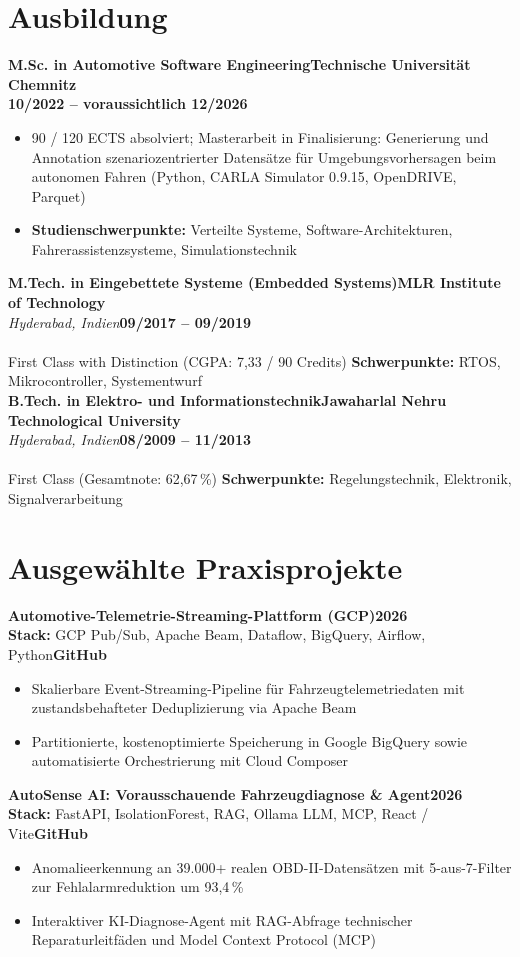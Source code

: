 \documentclass[10pt,a4paper]{article}
\newcommand{\educationitem}[4]{%
  \noindent\textbf{#1}\hfill\textbf{#2}\\[0.02em]
  {\footnotesize\textit{\color{accent} #3}}\hfill{\footnotesize\textbf{#4}}\\[0.04em]
}
\newcommand{\projectitem}[4]{%
  \noindent\textbf{#1}\hfill{\footnotesize\textbf{#2}}\\[0.02em]
  {\scriptsize\color{subtext}\textbf{Stack:} #3}\hfill{\scriptsize\textbf{#4}}\\[0.06em]
}
\newcommand{\cvliststart}{%
  \begin{itemize}[leftmargin=1.15em,labelsep=0.38em,topsep=0.04em,itemsep=0.04em,parsep=0pt,partopsep=0pt]
}
\newcommand{\cvlistend}{\end{itemize}\vspace{0.14em}}
\begin{document}
\newpage

\section{Ausbildung}

\educationitem{M.Sc. in Automotive Software Engineering}{Technische Universität Chemnitz}{}{10/2022 – voraussichtlich 12/2026}
\cvliststart
  \item 90 / 120 ECTS absolviert; Masterarbeit in Finalisierung: Generierung und Annotation szenariozentrierter Datensätze für Umgebungsvorhersagen beim autonomen Fahren (Python, CARLA Simulator 0.9.15, OpenDRIVE, Parquet)
  \item \textbf{Studienschwerpunkte:} Verteilte Systeme, Software-Architekturen, Fahrerassistenzsysteme, Simulationstechnik
\cvlistend

\educationitem{M.Tech. in Eingebettete Systeme (Embedded Systems)}{MLR Institute of Technology}{Hyderabad, Indien}{09/2017 – 09/2019}\\[-0.05em]
{\footnotesize First Class with Distinction (CGPA: 7,33 / 90 Credits) \enspace\textbar\enspace \textbf{Schwerpunkte:} RTOS, Mikrocontroller, Systementwurf}\\[0.20em]

\educationitem{B.Tech. in Elektro- und Informationstechnik}{Jawaharlal Nehru Technological University}{Hyderabad, Indien}{08/2009 – 11/2013}\\[-0.05em]
{\footnotesize First Class (Gesamtnote: 62,67\,\%) \enspace\textbar\enspace \textbf{Schwerpunkte:} Regelungstechnik, Elektronik, Signalverarbeitung}\\[0.25em]

\section{Ausgewählte Praxisprojekte}

\projectitem{Automotive-Telemetrie-Streaming-Plattform (GCP)}{2026}{GCP Pub/Sub, Apache Beam, Dataflow, BigQuery, Airflow, Python}{GitHub}
\cvliststart
  \item Skalierbare Event-Streaming-Pipeline für Fahrzeugtelemetriedaten mit zustandsbehafteter Deduplizierung via Apache Beam
  \item Partitionierte, kostenoptimierte Speicherung in Google BigQuery sowie automatisierte Orchestrierung mit Cloud Composer
\cvlistend

\projectitem{AutoSense AI: Vorausschauende Fahrzeugdiagnose \& Agent}{2026}{FastAPI, IsolationForest, RAG, Ollama LLM, MCP, React / Vite}{GitHub}
\cvliststart
  \item Anomalieerkennung an 39.000+ realen OBD-II-Datensätzen mit 5-aus-7-Filter zur Fehlalarmreduktion um 93,4\,\%
  \item Interaktiver KI-Diagnose-Agent mit RAG-Abfrage technischer Reparaturleitfäden und Model Context Protocol (MCP)
\cvlistend
\end{document}
